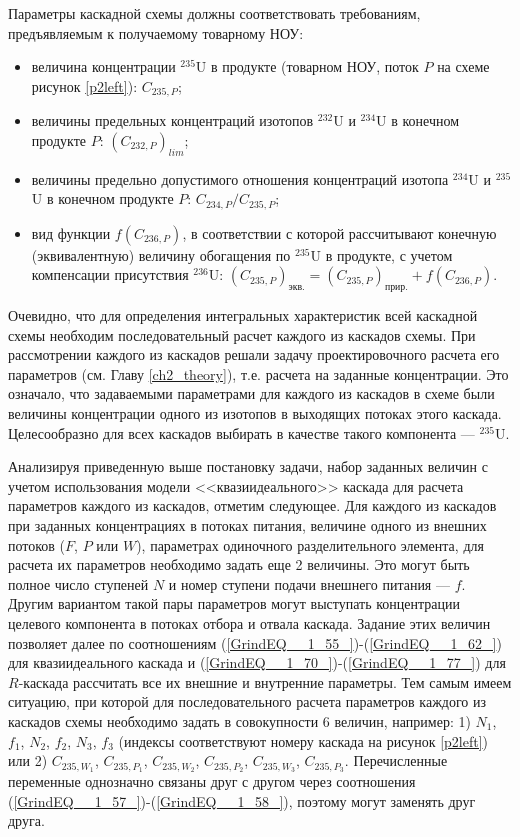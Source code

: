 Параметры каскадной схемы должны соответствовать требованиям, предъявляемым к получаемому товарному НОУ:

\begin{itemize}
    \item величина концентрации $^{235}$U в продукте (товарном НОУ, поток $P$ на схеме рисунок \ref{p2left}): $C_{235,{P}}$;
    \item величины предельных концентраций изотопов $^{232}$U и $^{234}$U в конечном продукте $P$: $(C_{232,{P}})_{lim}$;
    \item величины предельно допустимого отношения концентраций изотопа $^{234}$U и $^{235}$U в конечном продукте $P$: ${C_{234,{P}}}/{C_{235,{P}}}$;
    \item вид функции $f(C_{236,P})$, в соответствии с которой рассчитывают конечную (эквивалентную) величину обогащения по $^{235}$U в продукте, с учетом компенсации присутствия $^{236}$U:
    $(C_{235,P})_\textit{экв.}=(C_{235,P})_\textit{прир.}+f(C_{236,P})$.    
\end{itemize}

Очевидно, что для определения интегральных характеристик всей каскадной схемы необходим последовательный расчет каждого из каскадов схемы. При рассмотрении каждого из каскадов решали задачу проектировочного расчета его параметров (см. Главу \ref{ch2_theory}), т.е. расчета на заданные концентрации. Это означало, что задаваемыми параметрами для каждого из каскадов в схеме были величины концентрации одного из изотопов в выходящих потоках этого каскада. Целесообразно для всех каскадов выбирать в качестве такого компонента --- $^{235}$U.

Анализируя приведенную выше постановку задачи, набор заданных величин с учетом использования модели <<квазиидеального>> каскада для расчета параметров каждого из каскадов, отметим следующее. Для каждого из каскадов при заданных концентрациях в потоках питания, величине одного из внешних потоков ($F$, $P$ или $W$), параметрах одиночного разделительного элемента, для расчета их параметров необходимо задать еще 2 величины. Это могут быть полное число ступеней $N$ и номер ступени подачи внешнего питания --- $f$. Другим вариантом такой пары параметров могут выступать концентрации целевого компонента в потоках отбора и отвала каскада. Задание этих величин позволяет далее по соотношениям (\ref{GrindEQ__1_55_})-(\ref{GrindEQ__1_62_}) для квазиидеального каскада и (\ref{GrindEQ__1_70_})-(\ref{GrindEQ__1_77_}) для $R$-каскада рассчитать все их внешние и внутренние параметры. Тем самым имеем ситуацию, при которой для последовательного расчета параметров каждого из каскадов схемы необходимо задать в совокупности 6 величин, например: 1) $N_1$, $f_1$, $N_2$, $f_2$, $N_3$, $f_3$ (индексы соответствуют номеру каскада на рисунок \ref{p2left}) или 2) $C_{235,{W_1}}$, $C_{235,{P_1}}$, $C_{235,{W_2}}$, $C_{235,{P_2}}$, $C_{235,{W_3}}$, $C_{235,{P_3}}$. Перечисленные переменные однозначно связаны друг с другом через соотношения (\ref{GrindEQ__1_57_})-(\ref{GrindEQ__1_58_}), поэтому могут заменять друг друга. 

